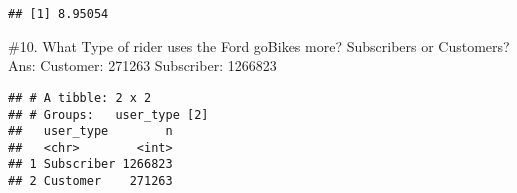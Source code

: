 \documentclass[]{article}
\newenvironment{Shaded}{\begin{snugshade}}{\end{snugshade}}
\newcommand{\CommentTok}[1]{\textcolor[rgb]{0.56,0.35,0.01}{\textit{#1}}}
\newcommand{\DataTypeTok}[1]{\textcolor[rgb]{0.13,0.29,0.53}{#1}}
\newcommand{\DecValTok}[1]{\textcolor[rgb]{0.00,0.00,0.81}{#1}}
\newcommand{\KeywordTok}[1]{\textcolor[rgb]{0.13,0.29,0.53}{\textbf{#1}}}
\newcommand{\NormalTok}[1]{#1}
\newcommand{\OperatorTok}[1]{\textcolor[rgb]{0.81,0.36,0.00}{\textbf{#1}}}
\newcommand{\OtherTok}[1]{\textcolor[rgb]{0.56,0.35,0.01}{#1}}
\newcommand{\StringTok}[1]{\textcolor[rgb]{0.31,0.60,0.02}{#1}}
\begin{document}
\begin{Shaded}
\end{Shaded}

\begin{verbatim}
## [1] 8.95054
\end{verbatim}

\begin{Shaded}
\end{Shaded}

\newpage

\#10. What Type of rider uses the Ford goBikes more? Subscribers or
Customers? Ans: Customer: 271263 Subscriber: 1266823

\begin{Shaded}
\end{Shaded}

\begin{verbatim}
## # A tibble: 2 x 2
## # Groups:   user_type [2]
##   user_type        n
##   <chr>        <int>
## 1 Subscriber 1266823
## 2 Customer    271263
\end{verbatim}
\end{document}

